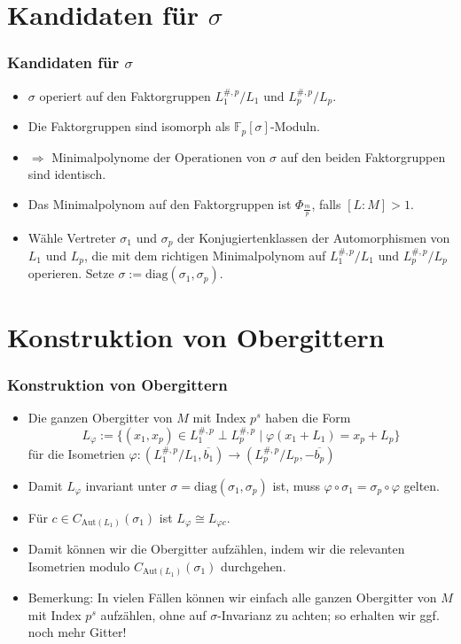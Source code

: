 \documentclass{beamer}
\newcommand{\F}{\mathbb{F}}
\begin{document}
\section{Kandidaten für $\sigma$}
\frame{\tableofcontents[currentsection]}
\begin{frame}[plain]
	\frametitle{Kandidaten für $\sigma$}
	\begin{itemize}
		\item $\sigma$ operiert auf den Faktorgruppen $L_1^{\#,p} / L_1$ und $L_p^{\#,p} / L_p$.
		\pause
		\item Die Faktorgruppen sind isomorph als $\F_p[\sigma]$-Moduln.
		\pause
		\item $\Rightarrow$ Minimalpolynome der Operationen von $\sigma$ auf den beiden Faktorgruppen sind identisch.
		\pause
		\item Das Minimalpolynom auf den Faktorgruppen ist $\Phi_\frac{m}{p}$, falls $[L : M] > 1$.
		\pause		
		\item Wähle Vertreter $\sigma_1$ und $\sigma_p$ der Konjugiertenklassen der Automorphismen von $L_1$ und $L_p$, die mit dem richtigen Minimalpolynom auf $L_1^{\#,p} / L_1$ und $L_p^{\#,p} / L_p$ operieren. Setze $\sigma := \text{diag}(\sigma_1, \sigma_p)$.
	\end{itemize}
\end{frame}

\section{Konstruktion von Obergittern}
\frame{\tableofcontents[currentsection]}
\begin{frame}[plain]
	\frametitle{Konstruktion von Obergittern}
	\begin{itemize}
		\item Die ganzen Obergitter von $M$ mit Index $p^s$ haben die Form
		\[L_\varphi := \lbrace (x_1,x_p) \in L_1^{\#,p} \perp L_p^{\#,p} \mid \varphi(x_1+L_1) = x_p + L_p \rbrace\]
		für die Isometrien $\varphi : (L_1^{\#,p} / L_1, \overline{b_1}) \rightarrow (L_p^{\#,p} / L_p, -\overline{b_p})$
		\pause
		\item Damit $L_\varphi$ invariant unter $\sigma = \text{diag}(\sigma_1, \sigma_p)$ ist, muss $\varphi \circ \sigma_1 = \sigma_p \circ \varphi$ gelten.
		\pause
		\item Für $c \in C_{\text{Aut}(L_1)}(\sigma_1)$ ist $L_{\varphi} \cong L_{\varphi c}$.
		\pause
		\item Damit können wir die Obergitter aufzählen, indem wir die relevanten Isometrien modulo $C_{\text{Aut}(L_1)}(\sigma_1)$ durchgehen.
		\pause
		\item Bemerkung: In vielen Fällen können wir einfach alle ganzen Obergitter von $M$ mit Index $p^s$ aufzählen, ohne auf $\sigma$-Invarianz zu achten; so erhalten wir ggf. noch mehr Gitter!
	\end{itemize}
\end{frame}
\end{document}
